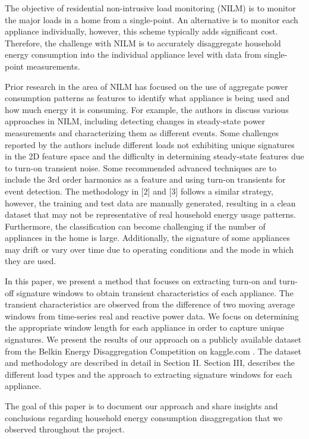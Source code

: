 \documentclass[conference]{IEEEtran}
\begin{document}
The objective of residential non-intrusive load monitoring (NILM) is to monitor the major loads in a home from a single-point.  An alternative is to monitor each appliance individually, however, this scheme typically adds significant cost. Therefore, the challenge with NILM is to accurately disaggregate household energy consumption into the individual appliance level with data from single-point measurements.  

Prior research in the area of NILM has focused on the use of aggregate power consumption patterns as features to identify what appliance is being used and how much energy it is consuming. For example, the authors in \cite{mit} discuss various approaches in NILM, including detecting changes in steady-state power measurements and characterizing them as different events. Some challenges reported by the authors include different loads not exhibiting unique signatures in the 2D feature space and the difficulty in determining steady-state features due to turn-on transient noise.  Some recommended advanced techniques are to include the 3rd order harmonics as a feature and using turn-on transients for event detection.  The methodology in [2] and [3] follows a similar strategy, however, the training and test data are manually generated, resulting in a clean dataset that may not be representative of real household energy usage patterns.  Furthermore, the classification can become challenging if the number of appliances in the home is large. Additionally, the signature of some appliances may drift or vary over time due to operating conditions and the mode in which they are used. 

In this paper, we present a method that focuses on extracting turn-on and turn-off signature windows to obtain transient characteristics of each appliance.  The transient characteristics are observed from the difference of two moving average windows from time-series real and reactive power data.  We focus on determining the appropriate window length for each appliance in order to capture unique signatures.  We present the results of our approach on a publicly available dataset from the Belkin Energy Disaggregation Competition on kaggle.com \cite{Kaggle}. The dataset and methodology are described in detail in Section II.  Section III, describes the different load types and the approach to extracting signature windows for each appliance.

The goal of this paper is to document our approach and share insights and conclusions regarding household energy consumption disaggregation that we observed throughout the project. 
\end{document}
